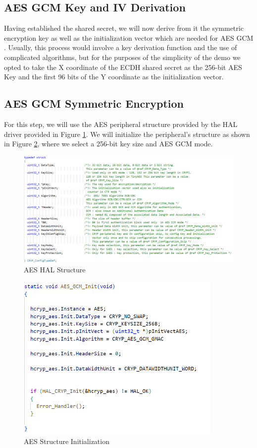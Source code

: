     \subsection{AES GCM Key and IV Derivation}
    Having established the shared secret, we will now derive from it the symmetric encryption key as well as the initialization vector which are needed for AES GCM .
    Usually, this process would involve a key derivation function and the use of complicated algorithms, but for the purposes of the simplicity of the demo  we opted to take the X coordinate of the ECDH shared secret as the 256-bit AES Key and the first 96 bits of the Y coordinate as the initialization vector.
    \subsection{AES GCM Symmetric Encryption}
    For this step, we will use the AES peripheral structure provided by the HAL driver provided in Figure \ref{fig:aes struct}. We will initialize the peripheral's structure as shown in Figure \ref{fig:aes init}, where we select a 256-bit key size and AES GCM mode.
    \begin{figure}[H]
    \centering
    \includegraphics[width=18cm]{img/aes struct.png}
        \caption{AES HAL Structure}
    \label{fig:aes struct}
    \end{figure}

    \begin{figure}[H]
    \centering
    \includegraphics[width=10cm]{img/aes init.png}
        \caption{AES Structure Initialization}
    \label{fig:aes init}
    \end{figure}


